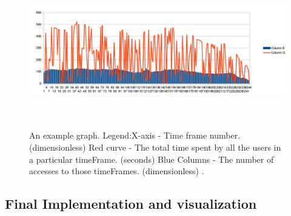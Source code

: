 \documentclass[16pt]{report}
\begin{document}
\begin{figure}[H]
\centering
\includegraphics[height=6cm]{Diag2.png}\\ %
\caption{An example graph. Legend:X-axis - Time frame number. (dimensionless)
Red curve - The total time spent by all the users in a particular timeFrame. (seconds)
Blue Columns - The number of accesses to those timeFrames. (dimensionless) \label{fig:Image2}.}
\end{figure}


















\subsection{Final Implementation and visualization}


%
%


\end{document}
